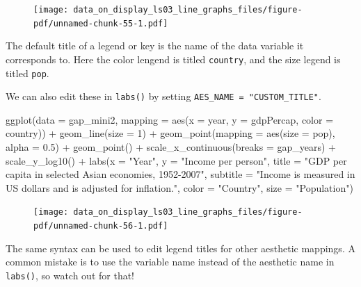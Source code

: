 \documentclass[
  letterpaper,
  DIV=11,
  numbers=noendperiod]{scrreprt}
\newenvironment{Shaded}{\begin{snugshade}}{\end{snugshade}}
\newcommand{\AttributeTok}[1]{\textcolor[rgb]{0.40,0.45,0.13}{#1}}
\newcommand{\DecValTok}[1]{\textcolor[rgb]{0.68,0.00,0.00}{#1}}
\newcommand{\FloatTok}[1]{\textcolor[rgb]{0.68,0.00,0.00}{#1}}
\newcommand{\FunctionTok}[1]{\textcolor[rgb]{0.28,0.35,0.67}{#1}}
\newcommand{\NormalTok}[1]{\textcolor[rgb]{0.00,0.23,0.31}{#1}}
\newcommand{\SpecialCharTok}[1]{\textcolor[rgb]{0.37,0.37,0.37}{#1}}
\newcommand{\StringTok}[1]{\textcolor[rgb]{0.13,0.47,0.30}{#1}}
\begin{document}
\begin{tcolorbox}
\begin{figure}[H]

{\centering \texttt{[image: data\_on\_display\_ls03\_line\_graphs\_files/figure-pdf/unnamed-chunk-55-1.pdf]}

}

\end{figure}

The default title of a legend or key is the name of the data variable it
corresponds to. Here the color lengend is titled \texttt{country}, and
the size legend is titled \texttt{pop}.

We can also edit these in \texttt{labs()} by setting
\texttt{AES\_NAME\ =\ "CUSTOM\_TITLE"}.

\begin{Shaded}
\begin{Highlighting}[]
\FunctionTok{ggplot}\NormalTok{(}\AttributeTok{data =}\NormalTok{ gap\_mini2, }
       \AttributeTok{mapping =} \FunctionTok{aes}\NormalTok{(}\AttributeTok{x =}\NormalTok{ year, }
                     \AttributeTok{y =}\NormalTok{ gdpPercap, }
                     \AttributeTok{color =}\NormalTok{ country)) }\SpecialCharTok{+}
  \FunctionTok{geom\_line}\NormalTok{(}\AttributeTok{size =} \DecValTok{1}\NormalTok{) }\SpecialCharTok{+}
  \FunctionTok{geom\_point}\NormalTok{(}\AttributeTok{mapping =} \FunctionTok{aes}\NormalTok{(}\AttributeTok{size =}\NormalTok{ pop),}
                           \AttributeTok{alpha =} \FloatTok{0.5}\NormalTok{) }\SpecialCharTok{+}
  \FunctionTok{geom\_point}\NormalTok{() }\SpecialCharTok{+}
  \FunctionTok{scale\_x\_continuous}\NormalTok{(}\AttributeTok{breaks =}\NormalTok{ gap\_years) }\SpecialCharTok{+}
  \FunctionTok{scale\_y\_log10}\NormalTok{()  }\SpecialCharTok{+}
  \FunctionTok{labs}\NormalTok{(}\AttributeTok{x =} \StringTok{"Year"}\NormalTok{, }
       \AttributeTok{y =} \StringTok{"Income per person"}\NormalTok{,}
       \AttributeTok{title =} \StringTok{"GDP per capita in selected Asian economies, 1952{-}2007"}\NormalTok{,}
       \AttributeTok{subtitle =} \StringTok{"Income is measured in US dollars and is adjusted for inflation."}\NormalTok{,}
       \AttributeTok{color =} \StringTok{"Country"}\NormalTok{,}
       \AttributeTok{size =} \StringTok{"Population"}\NormalTok{)}
\end{Highlighting}
\end{Shaded}

\begin{figure}[H]

{\centering \texttt{[image: data\_on\_display\_ls03\_line\_graphs\_files/figure-pdf/unnamed-chunk-56-1.pdf]}

}

\end{figure}

The same syntax can be used to edit legend titles for other aesthetic
mappings. A common mistake is to use the variable name instead of the
aesthetic name in \texttt{labs()}, so watch out for that!

\end{tcolorbox}
\end{document}
